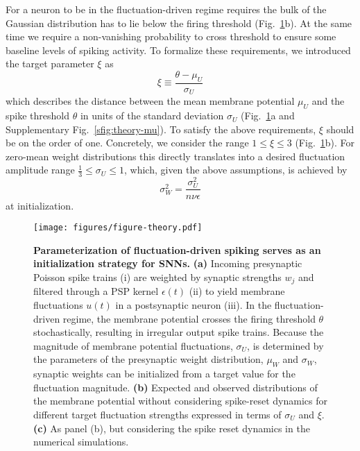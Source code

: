 \documentclass[11pt,a4paper]{article}
\begin{document}
For a neuron to be in the fluctuation-driven regime requires the bulk of the
Gaussian distribution has to lie below the firing threshold
(Fig.~\ref{fig:theory}b).
At the same time we require a non-vanishing probability to cross threshold to
ensure some baseline levels of spiking activity.
To formalize these requirements, we introduced the target parameter $\xi$ as 
\begin{equation} \label{eq:xi}
    \xi \equiv \frac{\theta-\mu_U}{\sigma_U}
\end{equation} 
which describes the distance between the mean membrane potential $\mu_U$ 
and the spike threshold $\theta$ in units of the standard deviation $\sigma_U$
(Fig.~\ref{fig:theory}a and Supplementary Fig.~\ref{sfig:theory-mu}).
To satisfy the above requirements, $\xi$ should be on the order of one.
Concretely, we consider the range $1 \leq \xi \leq 3$ (Fig.~\ref{fig:theory}b).
For zero-mean weight distributions this directly translates into 
a desired fluctuation amplitude range $\frac{1}{3} \leq \sigma_U \leq 1$,
which, given the above assumptions, is achieved by
\begin{equation}
\sigma^2_W = \frac{\sigma_U^2}{n \nu \hat\epsilon} 
\label{eq:wsigma-simple}
\end{equation}
at initialization.

\begin{figure}[tbh]
\texttt{[image: figures/figure-theory.pdf]}
    \caption{
    \textbf{Parameterization of fluctuation-driven spiking serves as
an initialization strategy for \acp{SNN}.} 
\textbf{(a)} Incoming presynaptic Poisson spike trains (i) are weighted by
synaptic strengths $w_j$ and filtered through a \ac{PSP} kernel $\epsilon(t)$
(ii) to yield membrane fluctuations $u(t)$ in a postsynaptic neuron (iii). 
In the fluctuation-driven regime, the membrane potential crosses the firing
threshold $\theta$ stochastically, resulting in irregular output spike trains.
Because the magnitude of membrane potential fluctuations, $\sigma_U$, is
determined by the parameters of the presynaptic weight distribution, $\mu_W$
and $\sigma_W$, synaptic weights can be initialized from a target value for the
fluctuation magnitude.
\textbf{(b)} Expected and observed distributions of the membrane potential
without considering spike-reset dynamics for different target fluctuation
strengths expressed in terms of $\sigma_U$ and $\xi$. 
\textbf{(c)} As panel (b), but considering the
spike reset dynamics in the numerical simulations.
}
\label{fig:theory}
\end{figure}
\end{document}

